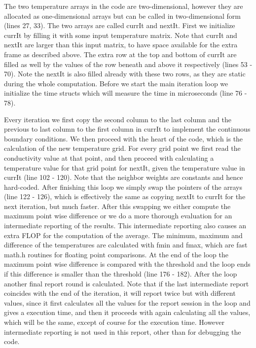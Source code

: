 \documentclass[11pt,a4paper,onecolumn]{article}
\begin{document}
The two temperature arrays in the code are two-dimensional, however they are allocated as one-dimensional arrays but can be called in two-dimensional form (lines 27, 33). The two arrays are called currIt and nextIt. First we initialize currIt by filling it with some input temperature matrix. Note that currIt and nextIt are larger than this input matrix, to have space available for the extra frame as described above. The extra row at the top and bottom of currIt are filled as well by the values of the row beneath and above it respectively (lines 53 - 70). Note the nextIt is also filled already with these two rows, as they are static during the whole computation. Before we start the main iteration loop we initialize the time structs which will measure the time in microseconds (line 76 - 78).

Every iteration we first copy the second column to the last column and the previous to last column to the first column in currIt to implement the continuous boundary conditions. We then proceed with the heart of the code, which is the calculation of the new temperature grid. For every grid point we first read the conductivity value at that point, and then proceed with calculating a temperature value for that grid point for nextIt, given the temperature value in currIt (line 102 - 120). Note that the neighbor weights are constants and hence hard-coded. After finishing this loop we simply swap the pointers of the arrays (line 122 - 126), which is effectively the same as copying nextIt to currIt for the next iteration, but much faster. After this swapping we either compute the maximum point wise difference or we do a more thorough evaluation for an intermediate reporting of the results. This intermediate reporting also causes an extra FLOP for the computation of the average. The minimum, maximum and difference of the temperatures are calculated with fmin and fmax, which are fast math.h routines for floating point comparisons. At the end of the loop the maximum point wise difference is compared with the threshold and the loop ends if this difference is smaller than the threshold (line 176 - 182). After the loop another final report round is calculated. Note that if the last intermediate report coincides with the end of the iteration, it will report twice but with different values, since it first calculates all the values for the report session in the loop and gives a execution time, and then it proceeds with again calculating all the values, which will be the same, except of course for the execution time. However intermediate reporting is not used in this report, other than for debugging the code.
\end{document}
